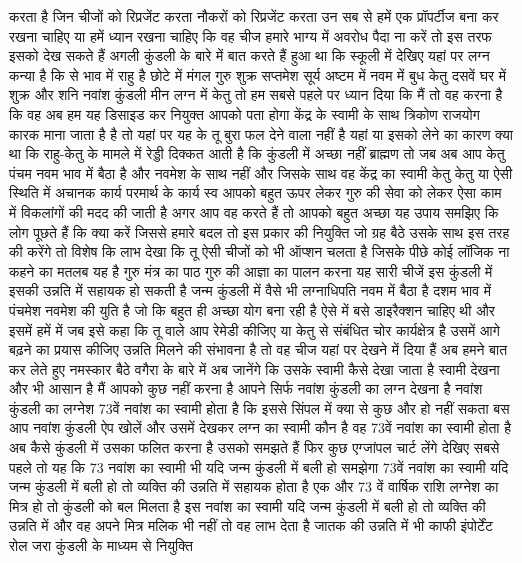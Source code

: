 करता है जिन चीजों को रिप्रजेंट करता नौकरों को रिप्रजेंट करता उन सब से हमें एक प्रॉपर्टीज बना कर रखना चाहिए या हमें
ध्यान रखना चाहिए कि वह चीज हमारे भाग्य में अवरोध पैदा ना करें तो इस तरफ इसको देख सकते हैं अगली कुंडली के बारे में बात
करते हैं हुआ था कि स्कूली में देखिए यहां पर लग्न कन्या
है कि से भाव में राहु है छोटे में मंगल गुरु शुक्र सप्तमेश सूर्य अष्टम में नवम
में बुध केतु दसवें घर में शुक्र और शनि नवांश कुंडली मीन लग्न में केतु तो हम
सबसे पहले पर ध्यान दिया कि मैं तो वह
करना है कि वह अब हम यह डिसाइड कर नियुक्त
आपको पता होगा केंद्र के स्वामी के साथ त्रिकोण राजयोग कारक माना जाता है
है तो यहां पर यह के तू बुरा फल देने वाला नहीं है यहां या इसको लेने का कारण क्या था कि राहु-केतु के मामले में रेड्डी
दिक्कत आती है कि कुंडली में अच्छा नहीं ब्राह्मण तो जब अब आप केतु पंचम नवम भाव
में बैठा है और नवमेश के साथ नहीं और जिसके साथ वह केंद्र का स्वामी केतु केतु
या ऐसी स्थिति में अचानक कार्य परमार्थ के कार्य स्व आपको बहुत ऊपर लेकर गुरु की
सेवा को लेकर ऐसा काम में विकलांगों की मदद की जाती है अगर आप वह करते हैं तो
आपको बहुत अच्छा यह उपाय समझिए कि लोग पूछते हैं कि क्या करें जिससे हमारे बदल
तो इस प्रकार की नियुक्ति जो ग्रह बैठे
उसके साथ इस तरह की करेंगे तो विशेष कि लाभ देखा कि तू ऐसी चीजों को भी ऑप्शन
चलता है जिसके पीछे कोई लॉजिक ना कहने का मतलब यह है गुरु मंत्र का पाठ गुरु की आज्ञा का पालन करना यह सारी चीजें इस
कुंडली में इसकी उन्नति में सहायक हो सकती है जन्म कुंडली में वैसे भी लग्नाधिपति नवम में बैठा है दशम भाव में पंचमेश नवमेश
की युति है जो कि बहुत ही अच्छा योग बना रही है ऐसे में बसे डाइरैक्शन चाहिए थी और इसमें हमें में जब इसे कहा कि तू वाले आप
रेमेडी कीजिए या केतु से संबंधित चोर कार्यक्षेत्र है उसमें आगे बढ़ने का प्रयास कीजिए उन्नति मिलने की संभावना है
तो वह चीज यहां पर देखने में दिया हैं अब हमने बात कर लेते हुए नमस्कार बैठे वगैरा के बारे में अब जानेंगे कि उसके
स्वामी कैसे देखा जाता है स्वामी देखना और भी आसान है मैं आपको कुछ नहीं करना है आपने सिर्फ
नवांश कुंडली का लग्न देखना है नवांश कुंडली का लग्नेश 73वें नवांश का स्वामी
होता है कि इससे सिंपल में क्या से कुछ और हो नहीं सकता बस आप नवांश कुंडली ऐप खोलें और उसमें देखकर लग्न का स्वामी कौन है वह
73वें नवांश का स्वामी होता है अब कैसे कुंडली में उसका फलित करना है उसको समझते हैं फिर कुछ एग्जांपल चार्ट लेंगे देखिए
सबसे पहले तो यह कि 73 नवांश का स्वामी भी यदि जन्म कुंडली में बली हो समझेगा 73वें
नवांश का स्वामी यदि जन्म कुंडली में बली हो तो व्यक्ति की उन्नति में सहायक होता है एक और 73 वें वार्षिक राशि लग्नेश का
मित्र हो तो कुंडली को बल मिलता है इस नवांश का स्वामी यदि जन्म कुंडली में बली
हो तो व्यक्ति की उन्नति में और वह अपने मित्र मलिक भी नहीं तो वह लाभ देता है
जातक की उन्नति में भी काफी इंपोर्टेंट रोल जरा कुंडली के माध्यम से नियुक्ति
